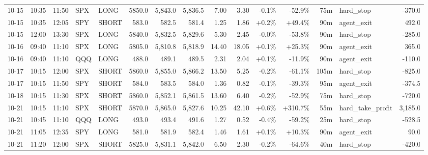 \documentclass[11pt,a4paper,twoside]{article}
\begin{document}
\begin{landscape}
\begin{center}
\begin{longtable}{>{\color{txtmain}}l l l l l r r r r r r r r >{\color{txtmain}}l r}
10-15 & 10:35 & 11:50 & SPX & LONG & 5850.0 & 5,843.0 & 5,836.5 & 7.00 & 3.30 & \textcolor{lossred}{-0.1\%} & \textcolor{lossred}{-52.9\%} & 75m & hard\_stop & \textcolor{lossred}{-370.0} \\
10-15 & 10:35 & 12:05 & SPY & SHORT & 583.0 & 582.5 & 581.4 & 1.25 & 1.86 & \textcolor{wingreen}{+0.2\%} & \textcolor{wingreen}{+49.4\%} & 90m & agent\_exit & \textcolor{wingreen}{492.0} \\
10-15 & 12:00 & 13:30 & SPX & LONG & 5840.0 & 5,832.5 & 5,829.6 & 5.30 & 2.45 & \textcolor{lossred}{-0.0\%} & \textcolor{lossred}{-53.8\%} & 90m & hard\_stop & \textcolor{lossred}{-285.0} \\
10-16 & 09:40 & 11:10 & SPX & LONG & 5805.0 & 5,810.8 & 5,818.9 & 14.40 & 18.05 & \textcolor{wingreen}{+0.1\%} & \textcolor{wingreen}{+25.3\%} & 90m & agent\_exit & \textcolor{wingreen}{365.0} \\
10-16 & 09:40 & 11:10 & QQQ & LONG & 488.0 & 489.1 & 489.5 & 2.31 & 2.04 & \textcolor{wingreen}{+0.1\%} & \textcolor{lossred}{-11.9\%} & 90m & agent\_exit & \textcolor{lossred}{-110.0} \\
10-17 & 10:15 & 12:00 & SPX & SHORT & 5860.0 & 5,855.0 & 5,866.2 & 13.50 & 5.25 & \textcolor{lossred}{-0.2\%} & \textcolor{lossred}{-61.1\%} & 105m & hard\_stop & \textcolor{lossred}{-825.0} \\
10-17 & 10:15 & 11:50 & SPY & SHORT & 584.0 & 583.5 & 584.0 & 1.36 & 0.82 & \textcolor{lossred}{-0.1\%} & \textcolor{lossred}{-39.3\%} & 95m & agent\_exit & \textcolor{lossred}{-374.5} \\
10-18 & 10:15 & 11:30 & SPX & SHORT & 5860.0 & 5,852.1 & 5,861.5 & 13.60 & 6.40 & \textcolor{lossred}{-0.2\%} & \textcolor{lossred}{-52.9\%} & 75m & hard\_stop & \textcolor{lossred}{-720.0} \\
10-21 & 10:15 & 11:10 & SPX & SHORT & 5870.0 & 5,865.0 & 5,827.6 & 10.25 & 42.10 & \textcolor{wingreen}{+0.6\%} & \textcolor{wingreen}{+310.7\%} & 55m & hard\_take\_profit & \textcolor{wingreen}{3,185.0} \\
10-21 & 10:45 & 11:10 & QQQ & LONG & 493.0 & 493.4 & 491.6 & 1.27 & 0.52 & \textcolor{lossred}{-0.4\%} & \textcolor{lossred}{-59.2\%} & 25m & hard\_stop & \textcolor{lossred}{-528.5} \\
10-21 & 11:05 & 12:35 & SPY & LONG & 581.0 & 581.9 & 582.4 & 1.46 & 1.61 & \textcolor{wingreen}{+0.1\%} & \textcolor{wingreen}{+10.3\%} & 90m & agent\_exit & \textcolor{wingreen}{90.0} \\
10-21 & 11:20 & 12:00 & SPX & SHORT & 5825.0 & 5,831.1 & 5,842.0 & 6.50 & 2.30 & \textcolor{lossred}{-0.2\%} & \textcolor{lossred}{-64.6\%} & 40m & hard\_stop & \textcolor{lossred}{-420.0} \\

\end{longtable}
\end{center}
\end{landscape}
\end{document}
